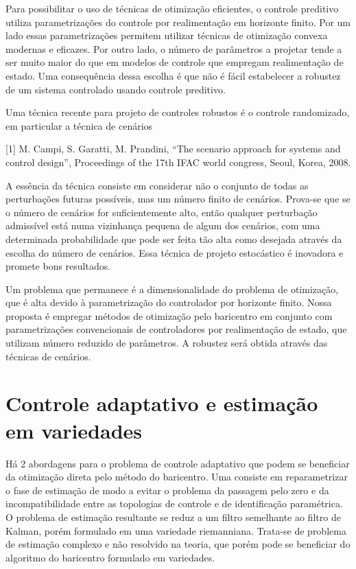 \documentclass{tufte-handout}
\begin{document}
Para possibilitar o uso de técnicas de otimização  eficientes, o controle preditivo utiliza parametrizações do controle por realimentação em horizonte finito. Por um lado essas parametrizações permitem utilizar técnicas de otimização convexa modernas e eficazes. Por outro lado, o número de parâmetros a projetar tende a ser muito maior do que em modelos de controle que empregam realimentação de estado. Uma consequência dessa escolha é que não é fácil estabelecer a robustez de um sistema controlado usando controle preditivo.

Uma técnica recente para projeto de controles robustos é o controle randomizado, em particular a técnica de cenários \cite{campi-garatti}

[1] M. Campi, S. Garatti, M. Prandini, “The scenario approach for systems and control design”, Proceedings of the 17th IFAC world congress, Seoul, Korea, 2008.

A essência da técnica consiste em considerar não o conjunto de todas as perturbações futuras possíveis, mas um número finito de cenários. Prova-se que se o número de cenários for suficientemente alto, então qualquer perturbação admissível está numa vizinhança pequena de algum dos cenários, com uma determinada probabilidade que pode ser feita tão alta como desejada através da escolha do número de cenários. Essa técnica de projeto estocástico é inovadora e promete bons resultados. 


Um problema que permanece é a  dimensionalidade do problema de otimização, que é alta devido à parametrização do controlador por horizonte finito. Nossa proposta é empregar  métodos de otimização pelo baricentro em conjunto com parametrizações convencionais de controladores por realimentação de estado, que utilizam número reduzido de parâmetros. A robustez será obtida através das técnicas de cenários.



\section{Controle adaptativo e estimação em variedades}

Há 2 abordagens para o problema de controle adaptativo que podem se beneficiar da otimização direta pelo método do baricentro. Uma consiste em reparametrizar o fase de estimação de modo a evitar o problema da passagem pelo zero e da incompatibilidade entre as topologias de controle e de identificação paramétrica. O problema de estimação resultante se reduz a um filtro semelhante ao filtro de Kalman, porém formulado em uma variedade riemanniana. Trata-se de problema de estimação complexo e não resolvido na teoria, que porém pode se beneficiar do algoritmo do baricentro formulado em variedades.
\end{document}
